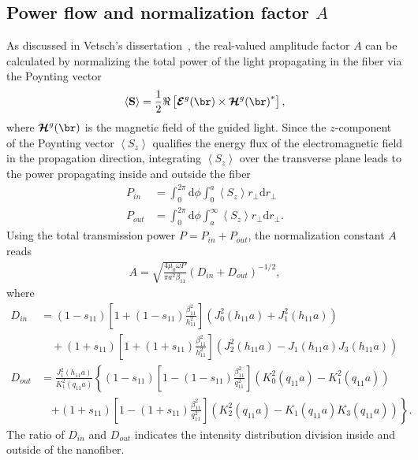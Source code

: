 \documentclass[]{report}
\begin{document}
\subsection{Power flow and normalization factor $ A $}
As discussed in Vetsch's dissertation~\cite{Vetsch2010a}, the real-valued amplitude factor $ A $ can be calculated by normalizing the total power of the light propagating in the fiber via the Poynting vector
\begin{align}
\left<\mathbf{S}\right>=\frac{1}{2} \Re\left[\boldsymbol{\mathcal{E}}^g(\br)\times{\boldsymbol{\mathcal{H}}^g(\br)}^* \right],
\end{align}
where $ \boldsymbol{\mathcal{H}}^g(\br) $ is the magnetic field of the guided light. 
Since the $ z $-component of the Poynting vector $ \left< S_z\right> $ qualifies the energy flux of the electromagnetic field in the propagation direction, integrating $ \left< S_z \right> $ over the transverse plane leads to the power propagating inside and outside the fiber
\begin{align}
P_{in} &= \int_0^{2\pi} \mathrm{d}\phi \int_0^a \left< S_z \right> r_\perp \mathrm{d}r_\perp\\
P_{out} &= \int_0^{2\pi} \mathrm{d}\phi \int_a^\infty \left< S_z \right> r_\perp \mathrm{d}r_\perp.
\end{align}
Using the total transmission power $ P=P_{in}+P_{out} $, the normalization constant $ A $ reads
\begin{align}\label{eq:A}
A=\sqrt{\frac{4\mu_0\omega P}{\pi a^2 \beta_{11}}}\left(D_{in} + D_{out} \right)^{-1/2},
\end{align}
where
\begin{align}
D_{in} &= (1-s_{11})\left[ 1+(1-s_{11})\frac{\beta_{11}^2}{h_{11}^2}\right] \left(J_0^2(h_{11}a) + J_1^2(h_{11}a) \right) \nonumber\\
&\quad + (1+s_{11})\left[ 1+(1+s_{11})\frac{\beta_{11}^2}{h_{11}^2}\right] \left(J_2^2(h_{11}a)- J_1(h_{11}a)J_3(h_{11}a) \right)\\
D_{out} &= \frac{J_1^2(h_{11}a)}{K_1^2(q_{11}a)}\left\{ (1-s_{11})\left[ 1-(1-s_{11})\frac{\beta_{11}^2}{q_{11}^2}\right] \left(K_0^2(q_{11}a) - K_1^2(q_{11}a) \right)\right. \nonumber\\
&\quad \left. + (1\!+\! s_{11})\left[ 1\!-\! (1\!+\! s_{11})\frac{\beta_{11}^2}{q_{11}^2}\right] \left(K_2^2(q_{11}a)\! -\! K_1(q_{11}a)K_3(q_{11}a) \right) \right\}.
\end{align}
The ratio of $ D_{in} $ and $ D_{out} $ indicates the intensity distribution division inside and outside of the nanofiber. 
\end{document}
